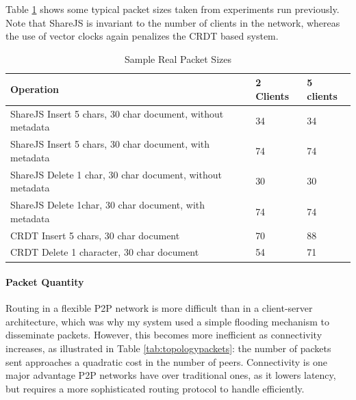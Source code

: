 \documentclass[12pt,a4paper,twoside,openright]{report}
\begin{document}
			Table \ref{tab:samplepacketsizes} shows some typical packet sizes taken from experiments run previously. Note that ShareJS is invariant to the number of clients in the network, whereas the use of vector clocks again penalizes the CRDT based system.
			
			\begin{table}[htb]
			\centering
			\caption[Sample Packet Sizes]{Sample Real Packet Sizes}
			\label{tab:samplepacketsizes}
			\setlength{\tabcolsep}{12pt}
			\begin{tabular}{@{}lll@{}}
			Operation													   & 2 Clients & 5 clients \\ \toprule
			ShareJS Insert 5 chars, 30 char document, without metadata & 34        & 34        \\ \midrule
			ShareJS Insert 5 chars, 30 char document, with metadata    & 74        & 74        \\ \midrule
			ShareJS Delete 1 char, 30 char document, without metadata  & 30        & 30        \\ \midrule
			ShareJS Delete 1char, 30 char document, with metadata      & 74        & 74       \\ \midrule
			CRDT Insert 5 chars, 30 char document                      & 70        & 88        \\ \midrule
			CRDT Delete 1 character, 30 char document                  & 54        & 71        \\ \bottomrule

			\end{tabular}
			\end{table}
			
			
			
		\paragraph{Packet Quantity}
			Routing in a flexible P2P network is more difficult than in a client-server architecture, which was why my system used a simple flooding mechanism to disseminate packets. However, this becomes more inefficient as connectivity increases, as illustrated in Table \ref{tab:topologypackets}: the number of packets sent approaches a quadratic cost in the number of peers. Connectivity is one major advantage P2P networks have over traditional ones, as it lowers latency, but requires a more sophisticated routing protocol to handle efficiently.
			
\end{document}
